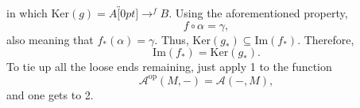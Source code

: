 \documentclass[../category_theory.tex]{subfiles}
\begin{document}
\begin{proof*}
\begin{center}
	\end{center}
	in which \(\mathrm{Ker}(g)=A\overbracket[0pt]{\rightarrow}^{f}B\). Using the aforementioned property,
	\[
		f\circ \alpha = \gamma,
	\]
	also meaning that \(f_{*}(\alpha )=\gamma \). Thus, \(\mathrm{Ker}(g_{*})\subseteq \mathrm{Im}(f_{*})\). Therefore,
	\[
		\mathrm{Im}(f_{*})=\mathrm{Ker}(g_{*}).
	\]
	To tie up all the loose ends remaining, just apply 1 to the function
	\[
		\mathcal{A}^{\mathrm{op}}(M, -) = \mathcal{A}(-, M),
	\]
	and one gets to 2. \qedsymbol
\end{proof*}
\end{document}
